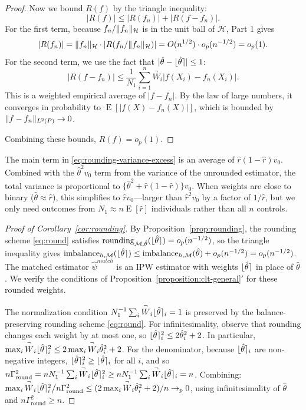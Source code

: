 \documentclass{article}
\DeclarePairedDelimiter\norm{\lVert}{\rVert}
\theoremstyle{definition}
\DeclareMathOperator{\E}{E}
\newcommand{\calH}{\ensuremath{\mathcal{H}}}
\DeclarePairedDelimiter\round{\lfloor}{\rceil}
\DeclareMathOperator{\imbalance}{imbalance}
\DeclareMathOperator{\roundingerror}{rounding}
\newcommand{\htheta}{\hat\theta}
\newcommand{\model}{\mathcal{M}}
\newcommand{\<}{\langle}
\renewcommand{\>}{\rangle}
\begin{document}
\begin{refsection}
\begin{proof}
Now we bound $R(f)$ by the triangle inequality:
\[
|R(f)| \le |R(f_n)| + |R(f - f_n)|.
\]
For the first term, because $f_n / \norm{f_n}_\calH$ is in the unit ball of $\calH$, Part 1 gives
\[
|R(f_n)| = \norm{f_n}_\calH \cdot |R(f_n / \norm{f_n}_\calH)| = O(n^{1/2}) \cdot o_p(n^{-1/2}) = o_p(1).
\]
For the second term, we use the fact that $|\hat\theta - \round{\hat\theta}| \le 1$:
\[
|R(f - f_n)| \le \frac{1}{N_1}\sum_{i=1}^n \overset{\neg}{W}_i |f(X_i) - f_n(X_i)|.
\]
This is a weighted empirical average of $|f - f_n|$. By the law of large numbers, it converges in probability to $\E[|f(X) - f_n(X)|]$, which is bounded by $\norm{f - f_n}_{L^2(P)} \to 0$.

Combining these bounds, $R(f) = o_p(1)$.
\end{proof}

The main term in \eqref{eq:rounding-variance-excess} is an average of $\hat r(1-\hat r) v_0$. Combined with the $\hat\theta^2 v_0$ term from the variance of the unrounded estimator, the total variance is proportional to $\{\hat\theta^2 + \hat r(1-\hat r)\} v_0$. When weights are close to binary ($\hat\theta \approx \hat r$), this simplifies to $\hat r v_0$---larger than $\hat r^2 v_0$ by a factor of $1/\hat r$, but we only need outcomes from $N_1 \approx n\E[\hat r]$ individuals rather than all $n$ controls.

\begin{proof}[Proof of Corollary~\ref{cor:rounding}]
By Proposition~\ref{prop:rounding}, the rounding scheme \eqref{eq:round} satisfies $\roundingerror_{\model,\htheta}(\round{\htheta}) = o_p(n^{-1/2})$, so the triangle inequality gives $\imbalance_{h,\model}(\round{\htheta}) \le \imbalance_{h,\model}(\htheta) + o_p(n^{-1/2}) = o_p(n^{-1/2})$.
The matched estimator $\hat\psi^{match}$ is an IPW estimator with weights $\round{\htheta}$ in place of $\htheta$. We verify the conditions of Proposition~\ref{proposition:clt-general}$'$ for these rounded weights.

The normalization condition $N_1^{-1}\sum_i \overset{\neg}{W}_i \round{\htheta}_i = 1$ is preserved by the balance-preserving rounding scheme \eqref{eq:round}. For infinitesimality, observe that rounding changes each weight by at most one, so $\round{\htheta}_i^2 \le 2\htheta_i^2 + 2$. In particular, $\max_i \overset{\neg}{W}_i \round{\htheta}_i^2 \le 2\max_i \overset{\neg}{W}_i \htheta_i^2 + 2$. For the denominator, because $\round{\htheta}_i$ are non-negative integers, $\round{\htheta}_i^2 \ge \round{\htheta}_i$ for all $i$, and so $n\Gamma_{\mathrm{round}}^2 = n N_1^{-1}\sum_i \overset{\neg}{W}_i \round{\htheta}_i^2 \ge n N_1^{-1}\sum_i \overset{\neg}{W}_i \round{\htheta}_i = n$. Combining: $\max_i \overset{\neg}{W}_i \round{\htheta}_i^2 \big/ n\Gamma_{\mathrm{round}}^2 \le (2\max_i \overset{\neg}{W}_i \htheta_i^2 + 2)/n \to_p 0$, using infinitesimality of $\htheta$ and $n\Gamma_{\mathrm{round}}^2 \ge n$.


\end{proof}
\end{refsection}
\end{document}
